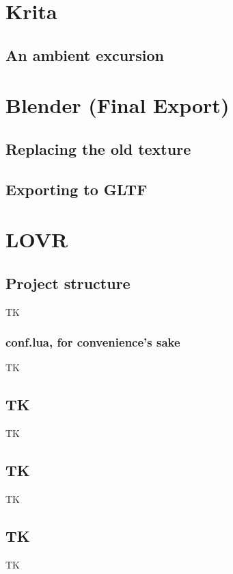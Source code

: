 \documentclass[12pt, letterpaper]{article}
\begin{document}
\section{Krita}

\subsection{An ambient excursion}

\section{Blender (Final Export)}

\subsection{Replacing the old texture}

\subsection{Exporting to GLTF}

\section{LOVR}

\subsection{Project structure}
TK

\subsubsection{conf.lua, for convenience's sake}
TK

\subsection{TK}
TK

\subsection{TK}
TK

\subsection{TK}
TK
\end{document}
